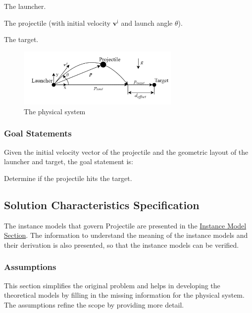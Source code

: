 \documentclass[12pt]{article}
\begin{document}
\begin{description}[font=\normalfont]
\item[PS1:]{The launcher.}
\item[PS2:]{The projectile (with initial velocity ${\symbf{v}^{\text{i}}}$ and launch angle $θ$).}
\item[PS3:]{The target.}
\end{description}
\begin{figure}[H]
\begin{center}
\includegraphics[width=0.7\textwidth]{../../../../datafiles/projectile/Launch.jpg}
\caption{The physical system}
\label{Figure:Launch}
\end{center}
\end{figure}
\subsubsection{Goal Statements}
\label{Sec:GoalStmt}
Given the initial velocity vector of the projectile and the geometric layout of the launcher and target, the goal statement is:

\begin{description}[font=\normalfont]
\item[targetHit:\phantomsection\label{targetHit}]{Determine if the projectile hits the target.}
\end{description}
\subsection{Solution Characteristics Specification}
\label{Sec:SolCharSpec}
The instance models that govern Projectile are presented in the \hyperref[Sec:IMs]{Instance Model Section}. The information to understand the meaning of the instance models and their derivation is also presented, so that the instance models can be verified.

\subsubsection{Assumptions}
\label{Sec:Assumps}
This section simplifies the original problem and helps in developing the theoretical models by filling in the missing information for the physical system. The assumptions refine the scope by providing more detail.
\end{document}
